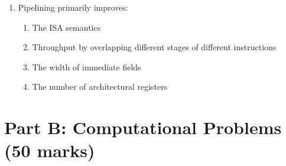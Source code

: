 \documentclass[11pt]{article}
\begin{document}
\begin{enumerate}[label=\textbf{A\arabic*.}]
  \item Pipelining primarily improves:
  \begin{enumerate}[label=(\Alph*)]
    \item The ISA semantics
    \item Throughput by overlapping different stages of different instructions
    \item The width of immediate fields
    \item The number of architectural registers
  \end{enumerate}
\end{enumerate}

\section*{Part B: Computational Problems (50 marks)}
\end{document}
